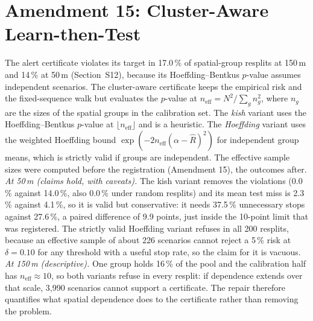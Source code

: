 \documentclass[lettersize,journal]{IEEEtran}
\begin{document}
\section{Amendment 15: Cluster-Aware Learn-then-Test}
\label{sec:s-a15}
The alert certificate violates its target in 17.0\,\% of spatial-group resplits at 150\,m and 14\,\% at 50\,m (Section~S12), because its Hoeffding--Bentkus $p$-value assumes independent scenarios. The cluster-aware certificate keeps the empirical risk and the fixed-sequence walk but evaluates the $p$-value at $n_{\mathrm{eff}}=N^2/\sum_g n_g^2$, where $n_g$ are the sizes of the spatial groups in the calibration set. The \emph{kish} variant uses the Hoeffding--Bentkus $p$-value at $\lfloor n_{\mathrm{eff}}\rfloor$ and is a heuristic. The \emph{Hoeffding} variant uses the weighted Hoeffding bound $\exp(-2n_{\mathrm{eff}}(\alpha-\hat R)^2)$ for independent group means, which is strictly valid if groups are independent. The effective sample sizes were computed before the registration (Amendment 15), the outcomes after. \emph{At 50\,m (claims hold, with caveats).} The kish variant removes the violations (0.0\,\% against 14.0\,\%, also 0.0\,\% under random resplits) and its mean test miss is 2.3\,\% against 4.1\,\%, so it is valid but conservative: it needs 37.5\,\% unnecessary stops against 27.6\,\%, a paired difference of 9.9 points, just inside the 10-point limit that was registered. The strictly valid Hoeffding variant refuses in all 200 resplits, because an effective sample of about 226 scenarios cannot reject a 5\,\% risk at $\delta=0.10$ for any threshold with a useful stop rate, so the claim for it is vacuous. \emph{At 150\,m (descriptive).} One group holds 16\,\% of the pool and the calibration half has $n_{\mathrm{eff}}\approx10$, so both variants refuse in every resplit: if dependence extends over that scale, 3{,}990 scenarios cannot support a certificate. The repair therefore quantifies what spatial dependence does to the certificate rather than removing the problem.
\end{document}
